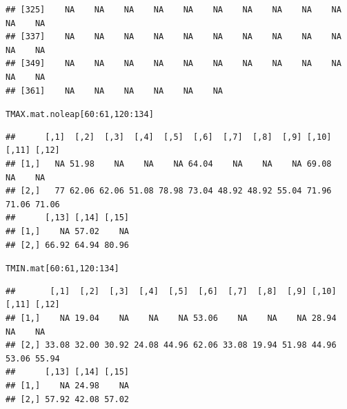 \documentclass{article}\usepackage[]{graphicx}\usepackage[]{color}
\makeatletter
\newcommand{\hlnum}[1]{\textcolor[rgb]{0.686,0.059,0.569}{#1}}%
\newcommand{\hlopt}[1]{\textcolor[rgb]{0,0,0}{#1}}%
\newcommand{\hlstd}[1]{\textcolor[rgb]{0.345,0.345,0.345}{#1}}%
\newenvironment{kframe}{%
 \def\at@end@of@kframe{}%
 \ifinner\ifhmode%
  \def\at@end@of@kframe{\end{minipage}}%
  \begin{minipage}{\columnwidth}%
 \fi\fi%
 \def\FrameCommand##1{\hskip\@totalleftmargin \hskip-\fboxsep
 \colorbox{shadecolor}{##1}\hskip-\fboxsep
     \hskip-\linewidth \hskip-\@totalleftmargin \hskip\columnwidth}%
 \MakeFramed {\advance\hsize-\width
   \@totalleftmargin\z@ \linewidth\hsize
   \@setminipage}}%
 {\par\unskip\endMakeFramed%
 \at@end@of@kframe}
\newenvironment{knitrout}{}{} %
\makeatother
\begin{document}
\begin{knitrout}
\begin{kframe}
\begin{verbatim}
## [325]    NA    NA    NA    NA    NA    NA    NA    NA    NA    NA    NA    NA
## [337]    NA    NA    NA    NA    NA    NA    NA    NA    NA    NA    NA    NA
## [349]    NA    NA    NA    NA    NA    NA    NA    NA    NA    NA    NA    NA
## [361]    NA    NA    NA    NA    NA    NA
\end{verbatim}
\begin{alltt}
\hlstd{TMAX.mat.noleap[}\hlnum{60}\hlopt{:}\hlnum{61}\hlstd{,}\hlnum{120}\hlopt{:}\hlnum{134}\hlstd{]}
\end{alltt}
\begin{verbatim}
##      [,1]  [,2]  [,3]  [,4]  [,5]  [,6]  [,7]  [,8]  [,9] [,10] [,11] [,12]
## [1,]   NA 51.98    NA    NA    NA 64.04    NA    NA    NA 69.08    NA    NA
## [2,]   77 62.06 62.06 51.08 78.98 73.04 48.92 48.92 55.04 71.96 71.06 71.06
##      [,13] [,14] [,15]
## [1,]    NA 57.02    NA
## [2,] 66.92 64.94 80.96
\end{verbatim}
\begin{alltt}
\hlstd{TMIN.mat[}\hlnum{60}\hlopt{:}\hlnum{61}\hlstd{,}\hlnum{120}\hlopt{:}\hlnum{134}\hlstd{]}
\end{alltt}
\begin{verbatim}
##       [,1]  [,2]  [,3]  [,4]  [,5]  [,6]  [,7]  [,8]  [,9] [,10] [,11] [,12]
## [1,]    NA 19.04    NA    NA    NA 53.06    NA    NA    NA 28.94    NA    NA
## [2,] 33.08 32.00 30.92 24.08 44.96 62.06 33.08 19.94 51.98 44.96 53.06 55.94
##      [,13] [,14] [,15]
## [1,]    NA 24.98    NA
## [2,] 57.92 42.08 57.02
\end{verbatim}
\end{kframe}
\end{knitrout}
\end{document}
